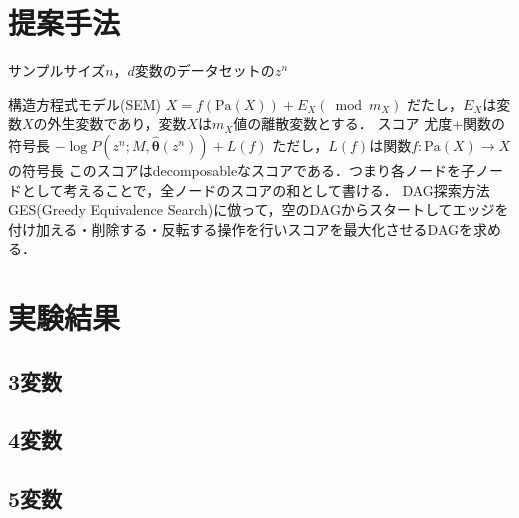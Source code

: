 \documentclass[dvipdfmx]{jsarticle}
\begin{document}
\section{提案手法}
サンプルサイズ$n$，$d$変数のデータセットの$z^n$

\begin{outline}
\1 構造方程式モデル(SEM)
    \2 $X = f(\text{Pa}(X)) + E_X (\bmod m_X)$
        \3 だたし，$E_X$は変数$X$の外生変数であり，変数$X$は$m_X$値の離散変数とする．
\1 スコア
    \2 尤度+関数の符号長
    \2 $- \log P(z^n; M, \hat{\bm{\theta}}(z^n)) + L(f)$
        \3 ただし，$L(f)$は関数$f: \text{Pa}(X) \to X$の符号長
        \3 このスコアはdecomposableなスコアである．つまり各ノードを子ノードとして考えることで，全ノードのスコアの和として書ける．
\1 DAG探索方法
    \2 GES(Greedy Equivalence Search)\cite{hauser2012characterization}に倣って，空のDAGからスタートしてエッジを付け加える・削除する・反転する操作を行いスコアを最大化させるDAGを求める．
\end{outline}

\section{実験結果}
\subsection{3変数}
\subsection{4変数}
\subsection{5変数}




\end{document}
